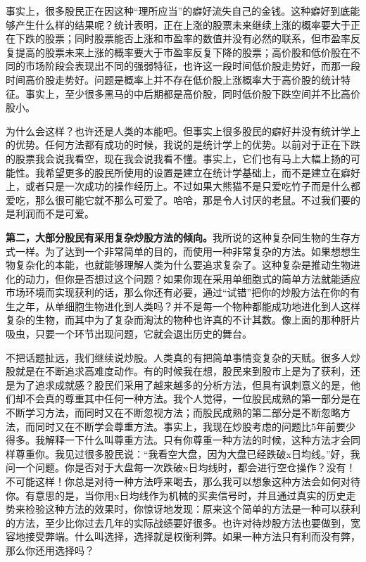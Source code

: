 事实上，很多股民正在因这种“理所应当”的癖好流失自己的金钱。这种癖好到底能够产生什么样的结果呢？统计表明，正在上涨的股票未来继续上涨的概率要大于正在下跌的股票；同时股票能否上涨和市盈率的数值并没有必然的联系，但市盈率反复提高的股票未来上涨的概率要大于市盈率反复下降的股票；高价股和低价股在不同的市场阶段会表现出不同的强弱特征，也许这一段时间低价股走势好，而那一段时间高价股走势好。问题是概率上并不存在低价股上涨概率大于高价股的统计特征。事实上，至少很多黑马的中后期都是高价股，同时低价股下跌空间并不比高价股小。

为什么会这样？也许还是人类的本能吧。但事实上很多股民的癖好并没有统计学上的优势。任何方法都有成功的时候，我说的是统计学上的优势。以前对于正在下跌的股票我会说我看空，现在我会说我看不懂。事实上，它们也有马上大幅上扬的可能性。我希望更多的股民所使用的设置是建立在统计学基础上，而不是建立在癖好上，或者只是一次成功的操作经历上。不过如果大熊猫不是只爱吃竹子而是什么都爱吃，那么很可能它就不那么可爱了。哈哈，那是令人讨厌的老鼠。不过我们要的是利润而不是可爱。

\textbf{第二，大部分股民有采用复杂炒股方法的倾向。}我所说的这种复杂同生物的生存方式一样。为了达到一个非常简单的目的，而使用一种非常复杂的方法。如果想想生物复杂化的本能，也就能够理解人类为什么要追求复杂了。这种复杂是推动生物进化的动力，但你是否想过这个问题？如果你现在采用单细胞式的简单方法就能适应市场环境而实现获利的话，那么你还有必要，通过“试错”把你的炒股方法在你的有生之年，从单细胞生物进化到人类吗？并不是每一个物种都能成功地进化到人这样复杂的生物，而其中为了复杂而淘汰的物种也许真的不计其数。像上面的那种肝片吸虫，只要一个环节出现问题，它就会退出历史的舞台。

不把话题扯远，我们继续说炒股。人类真的有把简单事情变复杂的天赋。很多人炒股就是在不断追求高难度动作。有的时候我在想，股民来到股市上是为了获利，还是为了追求成就感？股民们采用了越来越多的分析方法，但具有讽刺意义的是，他们却不会真的尊重其中任何一种方法。我个人觉得，一位股民成熟的第一部分是在不断学习方法，而同时又在不断忽视方法；而股民成熟的第二部分是不断忽略方法，而同时又在不断学会尊重方法。事实上，我现在炒股考虑的问题比5年前要少得多。我解释一下什么叫尊重方法。只有你尊重一种方法的时候，这种方法才会同样尊重你。我见过很多股民说：“我看空大盘，因为大盘已经跌破x日均线。”好，我问一个问题。你是否对于大盘每一次跌破x日均线时，都会进行空仓操作？没有！不可能这样！你总是对待一种方法呼来喝去，那么我可以想象这种方法会如何对待你。有意思的是，当你用x日均线作为机械的买卖信号时，并且通过真实的历史走势来检验这种方法的效果时，你惊讶地发现：原来这个简单的方法是一种可以获利的方法，至少比你过去几年的实际战绩要好很多。也许对待炒股方法也要做到，宽容地接受弊端。什么叫选择，选择就是权衡利弊。如果一种方法只有利而没有弊，那么你还用选择吗？

